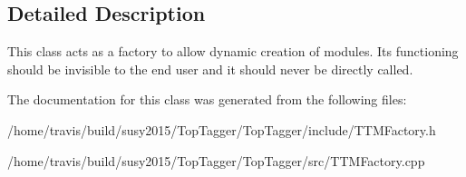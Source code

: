 \subsection{Detailed Description}
This class acts as a factory to allow dynamic creation of modules. Its functioning should be invisible to the end user and it should never be directly called. 

The documentation for this class was generated from the following files\-:\begin{DoxyCompactItemize}
\item 
/home/travis/build/susy2015/\-Top\-Tagger/\-Top\-Tagger/include/T\-T\-M\-Factory.\-h\item 
/home/travis/build/susy2015/\-Top\-Tagger/\-Top\-Tagger/src/T\-T\-M\-Factory.\-cpp\end{DoxyCompactItemize}
